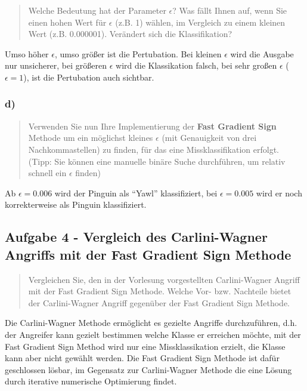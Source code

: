 \documentclass[11pt]{article}
\begin{document}
\begin{quote}
Welche Bedeutung hat der Parameter \(\epsilon\)? Was fällt Ihnen auf,
wenn Sie einen hohen Wert für \(\epsilon\) (z.B. 1) wählen, im Vergleich
zu einem kleinen Wert (z.B. 0.000001). Verändert sich die
Klassifikation?
\end{quote}

Umso höher \(\epsilon\), umso größer ist die Pertubation. Bei kleinen
\(\epsilon\) wird die Ausgabe nur unsicherer, bei größeren \(\epsilon\)
wird die Klassikation falsch, bei sehr großen \(\epsilon\)
(\(\epsilon=1\)), ist die Pertubation auch sichtbar.

    \hypertarget{d}{%
\subsubsection{d)}\label{d}}

\begin{quote}
Verwenden Sie nun Ihre Implementierung der \textbf{Fast Gradient Sign}
Methode um ein möglichst kleines \(\epsilon\) (mit Genauigkeit von drei
Nachkommastellen) zu finden, für das eine Missklassifikation erfolgt.\\
(Tipp: Sie können eine manuelle binäre Suche durchführen, um relativ
schnell ein \(\epsilon\) finden)
\end{quote}

Ab \(\epsilon=0.006\) wird der Pinguin als ``Yawl'' klassifiziert, bei
\(\epsilon=0.005\) wird er noch korrekterweise als Pinguin
klassifiziert.

    \hypertarget{aufgabe-4---vergleich-des-carlini-wagner-angriffs-mit-der-fast-gradient-sign-methode}{%
\subsection{Aufgabe 4 - Vergleich des Carlini-Wagner Angriffs mit der
Fast Gradient Sign
Methode}\label{aufgabe-4---vergleich-des-carlini-wagner-angriffs-mit-der-fast-gradient-sign-methode}}

\begin{quote}
Vergleichen Sie, den in der Vorlesung vorgestellten Carlini-Wagner
Angriff mit der Fast Gradient Sign Methode. Welche Vor- bzw. Nachteile
bietet der Carlini-Wagner Angriff gegenüber der Fast Gradient Sign
Methode.
\end{quote}

Die Carlini-Wagner Methode ermöglicht es gezielte Angriffe
durchzuführen, d.h. der Angreifer kann gezielt bestimmen welche Klasse
er erreichen möchte, mit der Fast Gradient Sign Method wird nur eine
Missklassikation erzielt, die Klasse kann aber nicht gewählt werden. Die
Fast Gradient Sign Methode ist dafür geschlossen lösbar, im Gegensatz
zur Carlini-Wagner Methode die eine Lösung durch iterative numerische
Optimierung findet.
\end{document}
